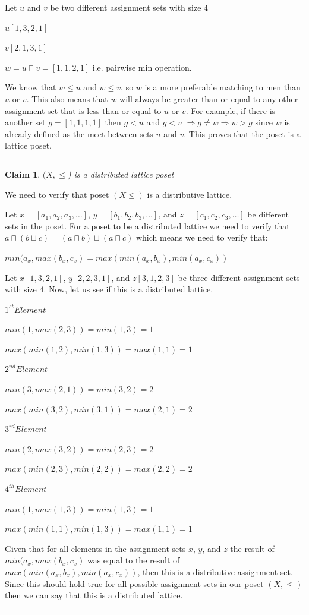 \documentclass[twoside]{article}
\newtheorem{claim}[theorem]{Claim}
\newenvironment{proof}{{\bf Proof:}}{\hfill\rule{2mm}{2mm}}
\begin{document}
\begin{proof} Let $u$ and $v$ be two different assignment sets with size $4$

$u[1, 3, 2, 1]$

$v[2, 1, 3, 1]$

$w = u \sqcap v = [1, 1, 2, 1]$ i.e. pairwise min operation.

We know that $w \leq u$ and $w \leq v$, so $w$ is a more preferable matching to men than $u$ or $v$. This also means that $w$ will always be greater than or equal to any other assignment set that is less than or equal to $u$ or $v$. For example, if there is another set $g = [1, 1, 1, 1]$ then $g < u$ and $g < v$ $\Longrightarrow g \neq w \Longrightarrow w > g$ since $w$ is already defined as the meet between sets $u$ and $v$. This proves that the poset is a lattice poset.
\end{proof}

\begin{claim}{$(X, \leq$) is a distributed lattice poset}
\end{claim}

We need to verify that poset $(X\leq)$ is a distributive lattice.

Let $x = [a_1, a_2, a_3, \ldots]$, $y = [b_1, b_2, b_3, \ldots]$, and $z = [c_1, c_2, c_3, \ldots]$ be different sets in the poset. For a poset to be a distributed lattice we need to verify that $a \sqcap (b \sqcup c) = (a \sqcap b) \sqcup (a \sqcap c)$ which means we need to verify that:

$min(a_x, max(b_x,c_x) = max (min(a_x,b_x), min(a_x,c_x))$

\begin{proof} Let $x[1, 3, 2, 1]$, $y[2, 2, 3, 1]$, and $z[3, 1, 2, 3]$ be three different assignment sets with size $4$. Now, let us see if this is a distributed lattice. 

\underline{$1^{st} Element$}

$min(1, max(2, 3)) = min(1, 3) = 1$

$max(min(1, 2), min(1, 3)) = max(1, 1) = 1$

\underline{$2^{nd} Element$}

$min(3, max(2, 1)) = min(3, 2) = 2$

$max(min(3, 2), min(3, 1)) = max(2, 1) = 2$

\underline{$3^{rd} Element$}

$min(2, max(3, 2)) = min(2, 3) = 2$

$max(min(2, 3), min(2, 2)) = max(2, 2) = 2$

\underline{$4^{th} Element$}

$min(1, max(1, 3)) = min(1, 3) = 1$

$max(min(1, 1), min(1, 3)) = max(1, 1) = 1$

Given that for all elements in the assignment sets $x$, $y$, and $z$ the result of $min(a_x, max(b_x,c_x)$ was equal to the result of $max (min(a_x,b_x), min(a_x,c_x))$, then this is a distributive assignment set. Since this should hold true for all possible assignment sets in our poset $(X, \leq)$ then we can say that this is a distributed lattice.\end{proof}
\end{document}
